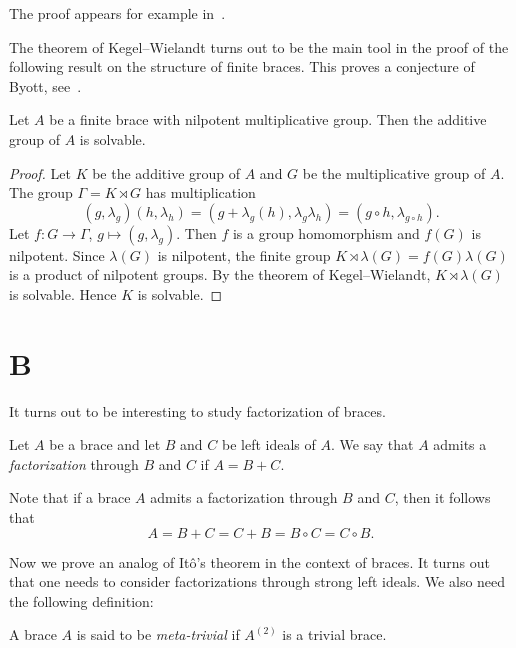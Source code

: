 The proof appears for example in~\cite[Theorem 2.4.3]{MR1211633}. 

The theorem of Kegel--Wielandt turns out to be the main tool in the proof of the following result 
on the structure of finite braces. 
This proves a conjecture 
of Byott, see~\cite{MR3425626}.

\begin{theorem}
\label{thm:mul_nilpotent}
Let $A$ be a finite brace with nilpotent multiplicative group. Then 
the additive group of $A$ is solvable.
\end{theorem}

\begin{proof}
    Let $K$ be the additive group of $A$ and $G$ be the multiplicative group of $A$. The group
    $\Gamma=K\rtimes G$ has multiplication
    \[
    (g,\lambda_g)(h,\lambda_h)=(g+\lambda_g(h),\lambda_g\lambda_h)=(g\circ h,\lambda_{g\circ h}).
    \]
    Let $f\colon G\to\Gamma$, $g\mapsto(g,\lambda_g)$. 
    Then $f$ is a group homomorphism and $f(G)$ is nilpotent. 
    Since $\lambda(G)$ is nilpotent, the finite group 
    $K\rtimes\lambda(G)=f(G)\lambda(G)$ is a product of nilpotent groups. 
    By the theorem of Kegel--Wielandt, $K\rtimes\lambda(G)$ 
    is solvable. Hence $K$ is solvable. 
\end{proof}

\section*{B}

It turns out to be interesting to study factorization of braces. 

\begin{definition}
    Let $A$ be a brace and let $B$ and $C$ be left ideals of $A$. We say
    that $A$ admits a \emph{factorization} through $B$ and $C$ if $A=B+C$.
\end{definition}

Note that if a brace $A$ admits a factorization through $B$ and $C$, then  
it follows that
\[
A=B+C=C+B=B\circ C=C\circ B.
\]

Now we prove an analog of It\^o's theorem in the context of braces. 
It turns out that one needs to consider factorizations through strong left ideals. We also need
the following
definition: 

\begin{definition}
A brace $A$ is said to be \emph{meta-trivial} if $A^{(2)}$ is a trivial brace. 
\end{definition}

